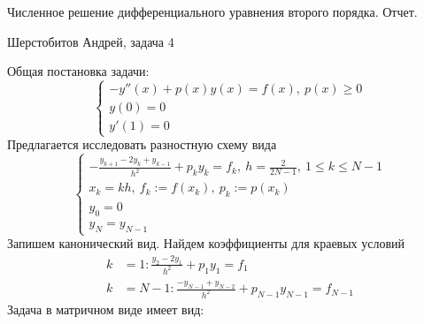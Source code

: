 \documentclass[12pt]{article}
\begin{document}
\begin{center}
	Численное решение дифференциального уравнения второго порядка. Отчет.
\end{center}
\begin{center}
	Шерстобитов Андрей, задача 4
\end{center}
Общая постановка задачи:
\[\begin{cases}
		-y''(x) +p(x)y(x) = f(x),\ p(x) \geq 0 \\
		y(0) = 0                               \\
		y'(1) = 0
	\end{cases}\]
Предлагается исследовать разностную схему вида
\[\begin{cases}
		-\frac{y_{k+1}-2y_k+y_{k-1}}{h^2}+p_ky_k = f_k,\ h = \frac{2}{2N-1},\ 1 \leq k \leq N-1 \\
		x_k = kh,\ f_k := f(x_k),\ p_k := p(x_k)                                                \\
		y_0 = 0                                                                                 \\
		y_N = y_{N-1}
	\end{cases}\]
Запишем канонический вид. Найдем коэффициенты для краевых условий
\begin{align*}
	k & = 1: \frac{y_2 - 2y_1}{h^2} + p_1y_1= f_1                         \\
	k & = N-1: \frac{-y_{N-1} + y_{N-2}}{h^2} + p_{N-1} y_{N-1} = f_{N-1}
\end{align*}
Задача в матричном виде имеет вид:
\end{document}
